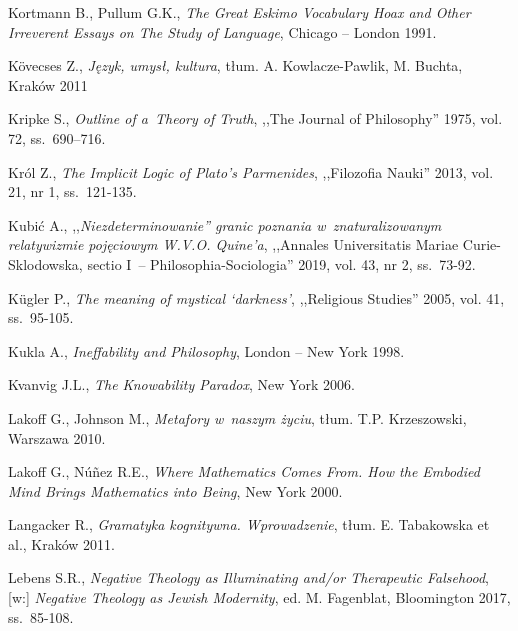 \begin{thebibliography}{100}
Kortmann B., Pullum G.K., \textit{The Great Eskimo Vocabulary Hoax and Other Irreverent Essays on The Study of Language}, Chicago -- London 1991.

Kövecses Z., \textit{Język, umysł, kultura}, tłum. A. Kowlacze-Pawlik, M. Buchta, Kraków 2011


Kripke S., \textit{Outline of a~Theory of Truth}, ,,The Journal of Philosophy'' 1975, vol. 72, ss.~690–716.

Król Z., \textit{The Implicit Logic of Plato's Parmenides}, ,,Filozofia Nauki'' 2013, vol. 21, nr 1, ss.~121-135.

Kubić A., ,,\textit{Niezdeterminowanie'' granic poznania w~znaturalizowanym relatywizmie pojęciowym W.V.O. Quine'a},
,,Annales Universitatis Mariae Curie-Sklodowska, sectio I~-- Philosophia-Sociologia'' 2019, vol. 43, nr 2, ss.~73-92.


Kügler P., \textit{The meaning of mystical ‘darkness'}, ,,Religious Studies'' 2005, vol. 41,  ss.~95-105.

Kukla A., \textit{Ineffability and Philosophy}, London -- New York 1998.

Kvanvig J.L., \textit{The Knowability Paradox}, New York 2006.

Lakoff G., Johnson M., \textit{Metafory w~naszym życiu}, tłum. T.P. Krzeszowski, Warszawa 2010.

Lakoff G., Núñez R.E., \textit{Where Mathematics Comes From. How the Embodied Mind Brings Mathematics into Being}, New York 2000.

Langacker R., \textit{Gramatyka kognitywna. Wprowadzenie}, tłum. E. Tabakowska et al., Kraków 2011.

Lebens S.R., \textit{Negative Theology as Illuminating and/or Therapeutic Falsehood}, [w:] \textit{Negative Theology as Jewish Modernity},
ed. M. Fagenblat, Bloomington 2017, ss.~85-108.


\end{thebibliography}
